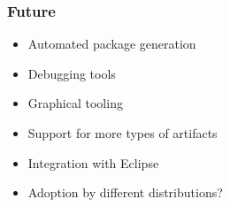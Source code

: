 \documentclass[pdftex,unicode,xcolor=table]{beamer}
\begin{document}
\begin{frame}
  \frametitle{Future}
  \begin{itemize}
    \item Automated package generation
    \item Debugging tools
    \item Graphical tooling
    \item Support for more types of artifacts
    \item Integration with Eclipse
    \item Adoption by different distributions?
  \end{itemize}
\end{frame}



 {
  \Rhbg{\frame{\theend}}
}
\end{document}
